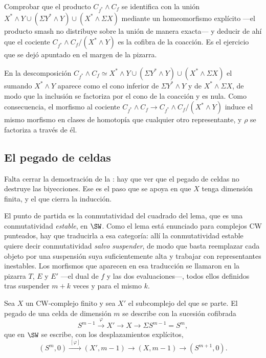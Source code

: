 \begin{ejer}
Comprobar que el producto $C_{f^*}\wedge C_f$ se identifica con la unión $X^*\wedge Y\cup(\Sigma Y^*\wedge Y)\cup(X^*\wedge\Sigma X)$ mediante un homeomorfismo explícito ---el producto smash no distribuye sobre la unión de manera exacta--- y deducir de ahí que el cociente $C_{f^*}\wedge C_f/(X^*\wedge Y)$ es la cofibra de la coacción. Es el ejercicio que se dejó apuntado en el margen de la pizarra.
\end{ejer}

\begin{sol}
En la descomposición $C_{f^*}\wedge C_f\simeq X^*\wedge Y\cup(\Sigma Y^*\wedge Y)\cup(X^*\wedge\Sigma X)$ el sumando $X^*\wedge Y$ aparece como el cono inferior de $\Sigma Y^*\wedge Y$ y de $X^*\wedge\Sigma X$, de modo que la inclusión se factoriza por el cono de la coacción y es nula. Como consecuencia, el morfismo al cociente $C_{f^*}\wedge C_f\to C_{f^*}\wedge C_f/(X^*\wedge Y)$ induce el mismo morfismo en clases de homotopía que cualquier otro representante, y $\rho$ se factoriza a través de él.
\end{sol}

\subsection{El pegado de celdas}

Falta cerrar la demostración de la : hay que ver que el pegado de celdas no destruye las biyecciones. Ese es el paso que se apoya en que $X$ tenga dimensión finita, y el que cierra la inducción.

El punto de partida es la conmutatividad del cuadrado del lema, que es una conmutatividad \emph{estable}, en $\SW$. Como el lema está enunciado para complejos CW punteados, hay que traducirla a esa categoría: allí la conmutatividad estable quiere decir conmutatividad \emph{salvo suspender}, de modo que basta reemplazar cada objeto por una suspensión suya suficientemente alta y trabajar con representantes inestables. Los morfismos que aparecen en esa traducción se llamaron en la pizarra $T$, $E$ y $E'$ ---el dual de $f$ y las dos evaluaciones---, todos ellos definidos tras suspender $m+k$ veces y para el mismo $k$.

Sea $X$ un CW-complejo finito y sea $X'$ el subcomplejo del que se parte. El pegado de una celda de dimensión $m$ se describe con la sucesión cofibrada
\[
S^{m-1}\xrightarrow{\ \varphi\ }X'\xrightarrow{\ }X\xrightarrow{\ }\Sigma S^{m-1}=S^m ,
\]
que en $\SW$ se escribe, con los desplazamientos explícitos,
\[
(S^m,0)\xrightarrow{\ [\varphi]\ }(X',m-1)\xrightarrow{\ }(X,m-1)\xrightarrow{\ }(S^{m+1},0).
\]

